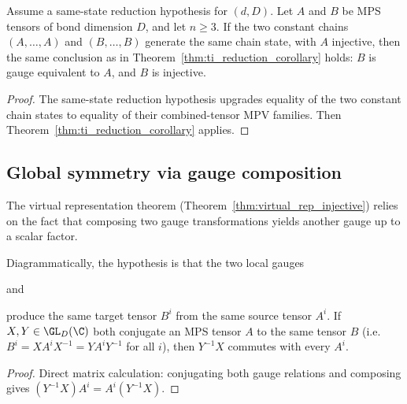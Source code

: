 \begin{theorem}%
    \label{thm:ti_reduction_of_sameState}
    \leanok
    Assume a same-state reduction hypothesis for $(d,D)$.
    Let $A$ and $B$ be MPS tensors of bond dimension $D$, and let $n \ge 3$.
    If the two constant chains $(A,\ldots,A)$ and $(B,\ldots,B)$ generate the
    same chain state, with $A$ injective, then the same conclusion as in
    Theorem~\ref{thm:ti_reduction_corollary} holds: $B$ is gauge equivalent to
    $A$, and $B$ is injective.
\end{theorem}

\begin{proof}\leanok
    The same-state reduction hypothesis upgrades equality of the two constant
    chain states to equality of their combined-tensor MPV families.
    Then Theorem~\ref{thm:ti_reduction_corollary} applies.
\end{proof}

\subsection{Global symmetry via gauge composition}

The virtual representation theorem
(Theorem~\ref{thm:virtual_rep_injective}) relies on the fact that
composing two gauge transformations yields another gauge up to a
scalar factor.

\begin{lemma}%
    \label{lem:gauge_ratio_commutes}
    \leanok
    Diagrammatically, the hypothesis is that the two local gauges
    \begin{center}
        \qquad and\qquad
    \end{center}
    produce the same target tensor $B^i$ from the same source tensor
    $A^i$.
    If $X, Y \in \GL_D(\C)$ both conjugate an MPS tensor $A$ to the same
    tensor $B$ (i.e.\ $B^i = X A^i X^{-1} = Y A^i Y^{-1}$ for all $i$),
    then $Y^{-1} X$ commutes with every $A^i$.
\end{lemma}

\begin{proof}\leanok
    Direct matrix calculation: conjugating both gauge relations and
    composing gives $(Y^{-1} X) A^i = A^i (Y^{-1} X)$.
\end{proof}

